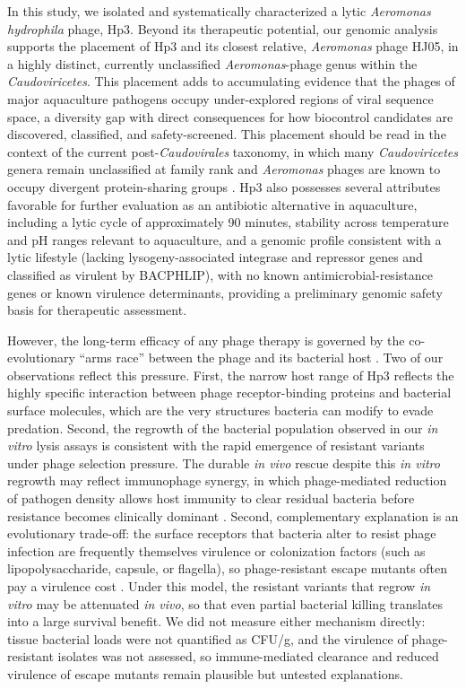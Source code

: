 \documentclass[11pt,a4paper]{article}
\begin{document}
In this study, we isolated and systematically characterized a lytic
\emph{Aeromonas hydrophila} phage, Hp3. Beyond its therapeutic
potential, our genomic analysis supports the placement of Hp3 and its
closest relative, \emph{Aeromonas} phage HJ05, in a highly distinct,
currently unclassified \emph{Aeromonas}-phage genus within the
\emph{Caudoviricetes}. This placement adds to accumulating evidence that
the phages of major aquaculture pathogens occupy under-explored regions
of viral sequence space, a diversity gap with direct consequences for how
biocontrol candidates are discovered, classified, and safety-screened. This placement should be read in the context of
the current post-\emph{Caudovirales} taxonomy, in which many
\emph{Caudoviricetes} genera remain unclassified at family rank and
\emph{Aeromonas} phages are known to occupy divergent protein-sharing
groups \citep{2023-Abolishment_Turner,2022-Characterization_Bujak}. Hp3
also possesses several attributes favorable for further evaluation as an
antibiotic alternative in aquaculture, including a lytic cycle of
approximately 90 minutes, stability across temperature and pH ranges
relevant to aquaculture, and a genomic profile consistent with a lytic
lifestyle (lacking lysogeny-associated integrase and repressor genes and
classified as virulent by BACPHLIP), with no known
antimicrobial-resistance genes or known virulence
determinants, providing a preliminary genomic safety basis for
therapeutic assessment.

However, the long-term efficacy of any phage therapy is governed by the co-evolutionary ``arms race'' between the phage and its
bacterial host \citep{2023-Developing_Oromi-Bosch}. Two of our
observations reflect this pressure. First, the narrow host range of Hp3
reflects the highly specific interaction between phage receptor-binding
proteins and bacterial surface molecules, which are the very structures
bacteria can modify to evade predation. Second, the regrowth of the
bacterial population observed in our \emph{in vitro} lysis assays is consistent
with the rapid emergence of resistant variants under phage selection
pressure. The durable \emph{in vivo} rescue despite this \emph{in vitro} regrowth may
reflect immunophage synergy, in which phage-mediated reduction of
pathogen density allows host immunity to clear residual bacteria before
resistance becomes clinically dominant \citep{2018-Phage_Torres-Barcelo}.
Second, complementary explanation is an evolutionary trade-off: the
surface receptors that bacteria alter to resist phage infection are
frequently themselves virulence or colonization factors (such as
lipopolysaccharide, capsule, or flagella), so phage-resistant escape
mutants often pay a virulence cost \citep{2015-Virulence_Leon}. Under
this model, the resistant variants that regrow \emph{in vitro} may be
attenuated \emph{in vivo}, so that even partial bacterial killing
translates into a large survival benefit. We did not measure either
mechanism directly: tissue bacterial loads were not quantified as CFU/g,
and the virulence of phage-resistant isolates was not assessed, so
immune-mediated clearance and reduced virulence of escape mutants remain
plausible but untested explanations.
\end{document}
